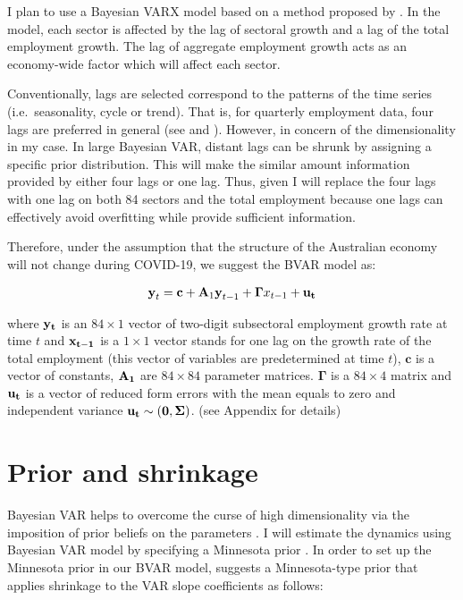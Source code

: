\documentclass{monashthesis}
\begin{document}
I plan to use a Bayesian VARX model based on a method proposed by \textcite{anderson2020}. In the model, each sector is affected by the lag of sectoral growth and a lag of the total employment growth. The lag of aggregate employment growth acts as an economy-wide factor which will affect each sector.

Conventionally, lags are selected correspond to the patterns of the time series (i.e.~seasonality, cycle or trend). That is, for quarterly employment data, four lags are preferred in general (see \textcite{anderson2020} and \textcite{stock2001}). However, in concern of the dimensionality in my case. In large Bayesian VAR, distant lags can be shrunk by assigning a specific prior distribution. This will make the similar amount information provided by either four lags or one lag. Thus, given I will replace the four lags with one lag on both 84 sectors and the total employment because one lags can effectively avoid overfitting while provide sufficient information.

Therefore, under the assumption that the structure of the Australian economy will not change during COVID-19, we suggest the BVAR model as:

\[
\begin{aligned}
\textbf{y}_t=\textbf{c}+\textbf{A}_1 \textbf{y}_{t-1}+\boldsymbol{\Gamma}{x}_{t-1}+\bf{u}_t
\end{aligned}
\]

where \(\bf{y}_t\) is an \(84\times1\) vector of two-digit subsectoral employment growth rate at time \(t\) and \(\bf{x}_{t-1}\) is a \(1\times1\) vector stands for one lag on the growth rate of the total employment (this vector of variables are predetermined at time \(t\)), \(\textbf{c}\) is a vector of constants, \(\bf{A}_{1}\) are \(84\times84\) parameter matrices. \(\boldsymbol{\Gamma}\) is a \(84\times4\) matrix and \(\bf{u}_t\) is a vector of reduced form errors with the mean equals to zero and independent variance \(\bf{u}_t \sim (0,\boldsymbol{\Sigma})\). (see Appendix for details)

\hypertarget{prior-and-shrinkage}{%
\section{Prior and shrinkage}\label{prior-and-shrinkage}}

Bayesian VAR helps to overcome the curse of high dimensionality via the imposition of prior beliefs on the parameters \autocite{banbura2010large}. I will estimate the dynamics using Bayesian VAR model by specifying a Minnesota prior \autocites[e.g.][]{anderson2020,litterman1986,robertson1999vector}. In order to set up the Minnesota prior in our BVAR model, \textcite{banbura2010large} suggests a Minnesota-type prior that applies shrinkage to the VAR slope coefficients as follows:
\end{document}
